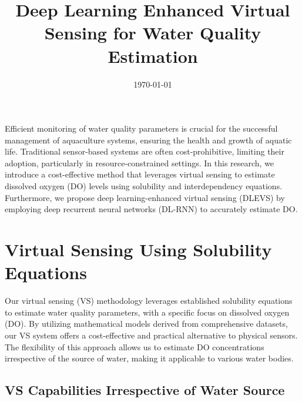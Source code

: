 \documentclass[a4paper, 11pt]{article}
\begin{document}
	
	\title{Deep Learning Enhanced Virtual Sensing for Water Quality Estimation}
	\date{\today}
	\maketitle
	
%	
	
	Efficient monitoring of water quality parameters is crucial for the successful management of aquaculture systems, ensuring the health and growth of aquatic life. Traditional sensor-based systems are often cost-prohibitive, limiting their adoption, particularly in resource-constrained settings. In this research, we introduce a cost-effective method that leverages virtual sensing to estimate dissolved oxygen (DO) levels using solubility and interdependency equations. Furthermore, we propose deep learning-enhanced virtual sensing (DLEVS) by employing deep recurrent neural networks (DL-RNN) to accurately estimate DO. 
	
	\section*{Virtual Sensing Using Solubility Equations}
	
	Our virtual sensing (VS) methodology leverages established solubility equations to estimate water quality parameters, with a specific focus on dissolved oxygen (DO). By utilizing mathematical models derived from comprehensive datasets, our VS system offers a cost-effective and practical alternative to physical sensors. The flexibility of this approach allows us to estimate DO concentrations irrespective of the source of water, making it applicable to various water bodies.
	
	\subsection*{VS Capabilities Irrespective of Water Source}
	
\end{document}
